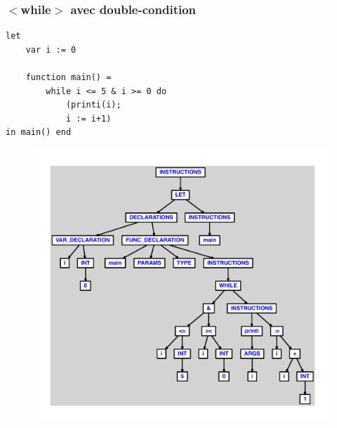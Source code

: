 \documentclass{article}
\begin{document}
\subsubsection{$ < $while$ > $ avec double-condition}
\begin{lstlisting}
let
	var i := 0

	function main() =
		while i <= 5 & i >= 0 do
			(printi(i);
			i := i+1)
in main() end
\end{lstlisting}
\newpage
\begin{figure}[H]
\centering
\includegraphics[max width=\textwidth]{ast/ast_331.pdf}
\end{figure}
\newpage
\end{document}

